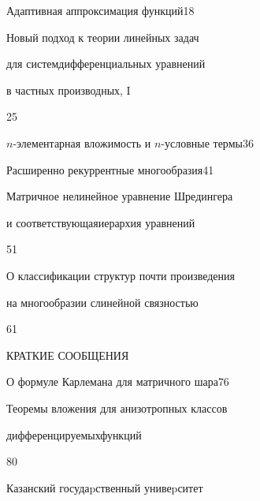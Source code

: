 {Адаптивная аппроксимация функций}{18}




{Новый подход к теории линейных задач 


для систем\newline дифференциальных уравнений 


в частных производных, I}{25}




{$n$-элементарная вложимость и $n$-условные термы}{36}




{Расширенно рекуррентные многообразия}{41}




{Матричное нелинейное уравнение Шредингера 


и соответствующая\newline иерархия уравнений}{51}




{О классификации структур почти произведения 


на многообразии с\newline линейной связностью}{61}







\bigskip





\centerline{КРАТКИЕ СООБЩЕНИЯ}


\bigskip







{О формуле Карлемана для матричного шара}{76}




{Теоремы вложения для анизотропных классов


дифференцируемых\newline функций}{80}











\vfill


\noindent\raisebox{2pt}{\copyright} Казанский госудаpственный унивеpситет





